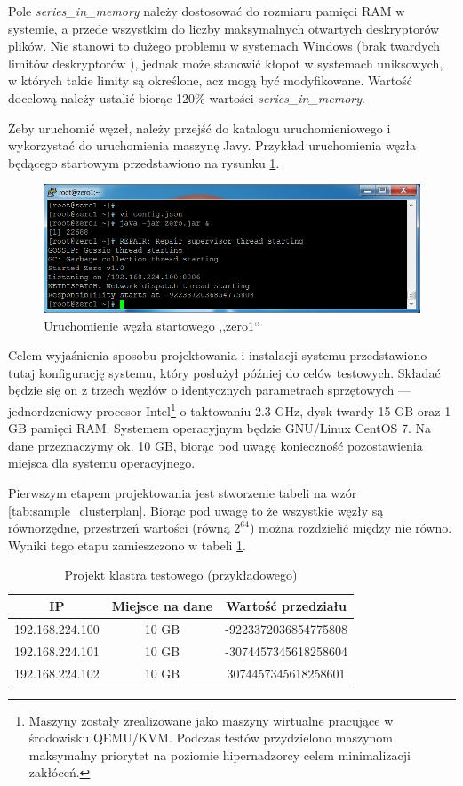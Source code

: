 \documentclass[a4paper,polish,12pt,twoside]{article}
\begin{document}
Pole \textit{series\_in\_memory} należy dostosować do rozmiaru pamięci RAM w systemie, a przede wszystkim do liczby maksymalnych otwartych deskryptorów plików. Nie stanowi to dużego problemu w systemach Windows (brak twardych limitów deskryptorów \cite{Russinovich:Limits}), jednak może stanowić kłopot w systemach uniksowych, w których takie limity są określone\cite{limits.conf}, acz mogą być modyfikowane. Wartość docelową należy ustalić biorąc 120\% wartości \textit{series\_in\_memory}.

Żeby uruchomić węzeł, należy przejść do katalogu uruchomieniowego i wykorzystać do uruchomienia maszynę Javy. Przykład uruchomienia węzła będącego startowym przedstawiono na rysunku \ref{fig:start_zero1}.

	\begin{figure}[h]
		\centering \includegraphics[width=14cm]{start_zero1}
		\caption{Uruchomienie węzła startowego ,,zero1``}
		\label{fig:start_zero1}
	\end{figure}

Celem wyjaśnienia sposobu projektowania i instalacji systemu przedstawiono tutaj konfigurację systemu, który posłużył później do celów testowych. Składać będzie się on z trzech węzłów o identycznych parametrach sprzętowych --- jednordzeniowy procesor Intel\footnote{Maszyny zostały zrealizowane jako maszyny wirtualne pracujące w środowisku QEMU/KVM. Podczas testów przydzielono maszynom maksymalny priorytet na poziomie hipernadzorcy celem minimalizacji zakłóceń.} o taktowaniu 2.3 GHz, dysk twardy 15 GB oraz 1 GB pamięci RAM. Systemem operacyjnym będzie GNU/Linux CentOS 7. Na dane przeznaczymy ok. 10 GB, biorąc pod uwagę konieczność pozostawienia miejsca dla systemu operacyjnego.

Pierwszym etapem projektowania jest stworzenie tabeli na wzór \ref{tab:sample_clusterplan}. Biorąc pod uwagę to że wszystkie węzły są równorzędne, przestrzeń wartości (równą $2^{64}$) można rozdzielić między nie równo. Wyniki tego etapu zamieszczono w tabeli \ref{tab:example_clusterplan}.

\begin{table} \centering \begin{tabular}{|c|c|c|}
\hline IP & Miejsce na dane & Wartość przedziału \\ \hline
192.168.224.100 & 10 GB & -9223372036854775808 \\
192.168.224.101 & 10 GB & -3074457345618258604 \\
192.168.224.102 & 10 GB & 3074457345618258601 \\
\hline \end{tabular}
\caption{Projekt klastra testowego (przykładowego)} \label{tab:example_clusterplan} \end{table}
\end{document}
